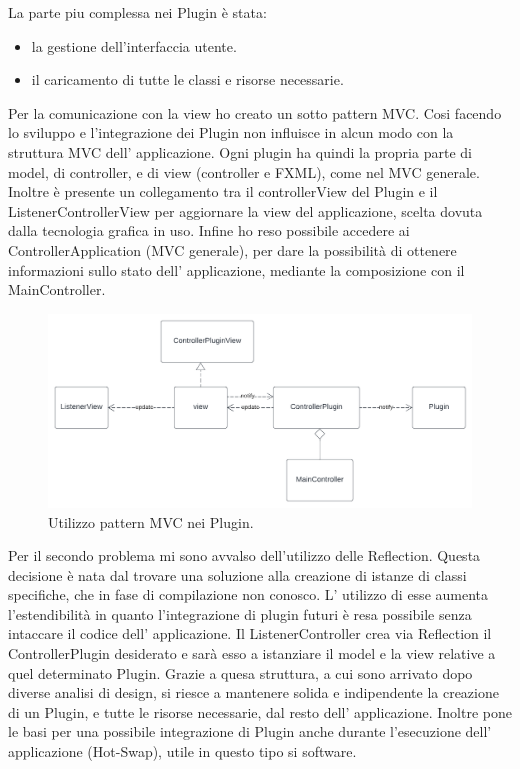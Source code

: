 \documentclass[a4paper,12pt]{report}
\begin{document}
%
La parte piu complessa nei Plugin è stata:
\begin{itemize}
	\item la gestione dell'interfaccia utente.
	\item il caricamento di tutte le classi e risorse necessarie.
\end{itemize}
Per la comunicazione con la view ho creato un sotto pattern MVC. Cosi facendo lo sviluppo e l'integrazione dei Plugin non influisce in alcun modo con
la struttura MVC dell' applicazione. Ogni plugin ha quindi la propria parte di model, di controller, e di view (controller e FXML), come nel MVC generale. Inoltre è presente un collegamento tra il controllerView del Plugin e il ListenerControllerView per aggiornare la view del applicazione, scelta dovuta dalla tecnologia grafica in uso. Infine ho reso possibile accedere ai ControllerApplication (MVC generale), per dare la possibilità di ottenere informazioni sullo stato dell' applicazione, mediante la composizione con il MainController.
\begin{figure}[H]
\centering{}
\includegraphics[width=\textwidth]{img/listener/PluginMVC.png}
\caption{Utilizzo pattern MVC nei Plugin.}
\label{img:Listener}
\end{figure}
%
Per il secondo problema mi sono avvalso dell'utilizzo delle Reflection. Questa decisione è nata dal trovare una soluzione alla creazione di istanze di classi specifiche, che in fase di compilazione non conosco. L' utilizzo di esse aumenta l'estendibilità in quanto l'integrazione di plugin futuri è resa possibile senza intaccare il codice dell' applicazione. Il ListenerController crea via Reflection il ControllerPlugin desiderato e sarà esso a istanziare il model e la view relative a quel determinato Plugin. Grazie a quesa struttura, a cui sono arrivato dopo diverse analisi di design, si riesce a mantenere solida e indipendente la creazione di un Plugin, e tutte le risorse necessarie, dal resto dell' applicazione. Inoltre pone le basi per una possibile integrazione di Plugin anche durante l'esecuzione dell' applicazione (Hot-Swap), utile in questo tipo si software.
\end{document}
